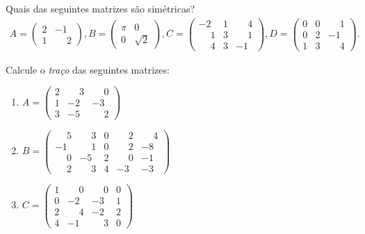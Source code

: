 \documentclass[12pt]{exam}
\begin{document}
    \questao{} Quais das seguintes matrizes são simétricas?
    \begin{align*}
        A = \begin{pmatrix}2 & -1\\1 & \phantom{-} 2\end{pmatrix},
        B = \begin{pmatrix}\pi & 0\\0 & \sqrt{2}\end{pmatrix},
        C = \begin{pmatrix}-2 & 1 & \phantom{-} 4\\\phantom{-} 1 & 3 & \phantom{-} 1\\\phantom{-} 4 & 3 & -1\end{pmatrix},
        D = \begin{pmatrix}0 & 0 & \phantom{-} 1\\0 & 2 & -1\\1 & 3 & \phantom{-} 4\end{pmatrix}.
    \end{align*}

    \vspace{.3cm}

    \questao{} Calcule o \textit{traço} das seguintes matrizes:
    \begin{enumerate}[label={\alph*})]
        \item $A = \begin{pmatrix}2 & \phantom{-} 3 & \phantom{-} 0\\1 & -2 & -3\\3 & -5 & \phantom{-} 2\end{pmatrix}$
        \item $B = \begin{pmatrix}\phantom{-} 5 & \phantom{-} 3 & 0 & \phantom{-} 2 & \phantom{-} 4\\-1 & \phantom{-} 1 & 0 & \phantom{-} 2 & -8\\\phantom{-} 0 & -5 & 2 & \phantom{-} 0 & -1\\\phantom{-} 2 & \phantom{-} 3 & 4 & -3 & -3\end{pmatrix}$
        \item $C = \begin{pmatrix}1 & \phantom{-} 0 & \phantom{-} 0 & 0\\0 & -2 & -3 & 1\\2 & \phantom{-} 4 & -2 & 2\\4 & -1 & \phantom{-} 3 & 0\end{pmatrix}$
    \end{enumerate}
\end{document}
